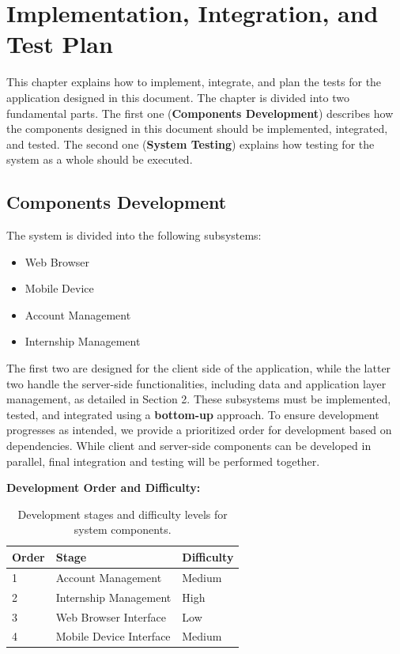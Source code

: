 \documentclass[11pt,twoside]{article}
\begin{document}
\newpage

\section{Implementation, Integration, and Test Plan}
This chapter explains how to implement, integrate, and plan the tests for the application designed in this document. The chapter is divided into two fundamental parts. The first one (\textbf{Components Development}) describes how the components designed in this document should be implemented, integrated, and tested. The second one (\textbf{System Testing}) explains how testing for the system as a whole should be executed.

\subsection{Components Development}
The system is divided into the following subsystems:
\begin{itemize}
\item Web Browser
\item Mobile Device
\item Account Management
\item Internship Management
\end{itemize}

The first two are designed for the client side of the application, while the latter two handle the server-side functionalities, including data and application layer management, as detailed in Section 2. These subsystems must be implemented, tested, and integrated using a \textbf{bottom-up} approach. To ensure development progresses as intended, we provide a prioritized order for development based on dependencies. While client and server-side components can be developed in parallel, final integration and testing will be performed together. 

\textbf{Development Order and Difficulty:}

\begin{table}[H]
\centering
\begin{tabular}{|p{}|p{}|p{}|}
\hline
\textbf{Order} & \textbf{Stage} & \textbf{Difficulty} \\
\hline
1 & Account Management & Medium \\
\hline
2 & Internship Management & High \\
\hline
3 & Web Browser Interface & Low \\
\hline
4 & Mobile Device Interface & Medium \\
\hline
\end{tabular}
\caption{Development stages and difficulty levels for system components.}
\end{table}
\end{document}
